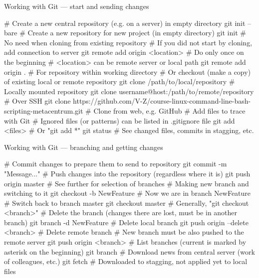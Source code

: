 \documentclass[compress, ucs, xelatex, 11pt, xcolor=svgnames, aspectratio=169,
	hyperref={
		bookmarks=true,
		unicode=true,
		colorlinks=true,
		pdftitle={Linux, command line and MetaCentrum},
		plainpages=false,
		pdfauthor={Vojtech Zeisek},
		pdfsubject={Course about use of Linux command line, writing shell scripts and using MetaCentrum of CESNET},
		pdfcreator={XeLaTeX},
		pdfkeywords={Linux, GNU, BASH, shell, command line, MetaCentrum},
		linkcolor=DarkRed, %
		anchorcolor=DarkBlue, %
		citecolor=Indigo, %
		filecolor=NavyBlue, %
		menucolor=DarkMagenta, %
		urlcolor=DarkBlue, %
		pdftex},
	url={hyphens, lowtilde} %
	]{beamer}
\begin{document}
\begin{frame}[fragile]{Working with Git --- start and sending changes}
	\begin{bashcode}
    # Create a new central repository (e.g. on a server) in empty directory
    git init --bare
    # Create a new repository for new project (in empty directory)
    git init # No need when cloning from existing repository
    # If you did not start by cloning, add connection to server
    git remote add origin <location> # Do only once on the beginning
    # <location> can be remote server or local path
    git remote add origin . # For repository within working directory
    # Or checkout (make a copy) of existing local or remote repository
    git clone /path/to/local/repository # Locally mounted repository
    git clone username@host:/path/to/remote/repository # Over SSH
    git clone https://github.com/V-Z/course-linux-command-line-bash-
      scripting-metacentrum.git # Clone from web, e.g. GitHub
    # Add files to trace with Git
    # Ignored files (or patterns) can be listed in .gitignore file
    git add <files> # Or "git add *"
    git status # See changed files, commits in stagging, etc.
	\end{bashcode}
\end{frame}

\begin{frame}[fragile]{Working with Git --- branching and getting changes}
	\begin{bashcode}
    # Commit changes to prepare them to send to repository
    git commit -m "Message..."
    # Push changes into the repository (regardless where it is)
    git push origin master # See further for selection of branches
    # Making new branch and switching to it
    git checkout -b NewFeature # Now we are in branch NewFeature
    # Switch back to branch master
    git checkout master # Generally, "git checkout <branch>"
    # Delete the branch (changes there are lost, must be in another branch)
    git branch -d NewFeature # Delete local branch
    git push origin --delete <branch> # Delete remote branch
    # New branch must be also pushed to the remote server
    git push origin <branch>
    # List branches (current is marked by asterisk on the beginning)
    git branch
    # Download news from central server (work of colleagues, etc.)
    git fetch # Downloaded to stagging, not applied yet to local files
	\end{bashcode}
\end{frame}
\end{document}
